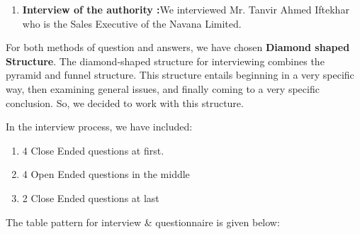 \begin{enumerate}
\item  \textbf{Interview of the authority :}We interviewed Mr. Tanvir Ahmed Iftekhar who is the Sales Executive of the Navana Limited.

\end{enumerate}

\noindent For both methods of question and answers, we have chosen \textbf{Diamond shaped Structure}. The diamond-shaped structure for interviewing combines the pyramid and funnel structure. This structure entails beginning in a very specific way, then examining general issues, and finally coming to a very specific conclusion. So, we decided to work with this structure.  

\noindent In the interview process, we have included:

\begin{enumerate}
\item  4 Close Ended questions at first. 

\item  4 Open Ended questions in the middle

\item  2 Close Ended questions at last
\end{enumerate}
\noindent The table pattern for interview \& questionnaire is given below:

